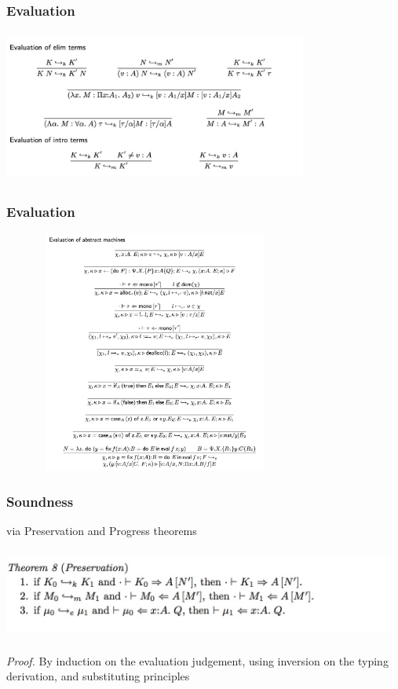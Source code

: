 \documentclass[xcolor=dvipsnames,9pt,hide notes,mathserif]{beamer}
\begin{document}
\begin{frame}
  \frametitle{Evaluation}
\begin{center}
  \includegraphics[width=10cm, height=5cm]{inputs/eval_elim_intro}
\end{center}
\end{frame}




\begin{frame}
  \frametitle{Evaluation}
\begin{center}
  \includegraphics[width=10cm, height=8cm]{inputs/eval_abs}
\end{center}
\end{frame}





\begin{frame}
  \frametitle{Soundness}
via Preservation and Progress theorems
\begin{center}
  \includegraphics[width=13cm, height=3cm]{inputs/preservation}
\end{center}
\textit{Proof.} By induction on the evaluation judgement, using inversion
on the typing derivation, and substituting principles

\end{frame}
\end{document}
